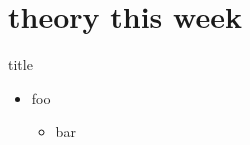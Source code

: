 \documentclass[10pt,
               svgnames,
               hyperref={colorlinks,citecolor=DeepPink4,linkcolor=FireBrick,urlcolor=Maroon},
               usepdftitle=false]{beamer}
\begin{document}
\section{theory this week}

\begin{frame}{title}

\begin{itemize}
\item foo
   \begin{itemize}
   \item[$\circ$] bar
   \end{itemize}
\end{itemize}
\end{frame}



%
\end{document}
